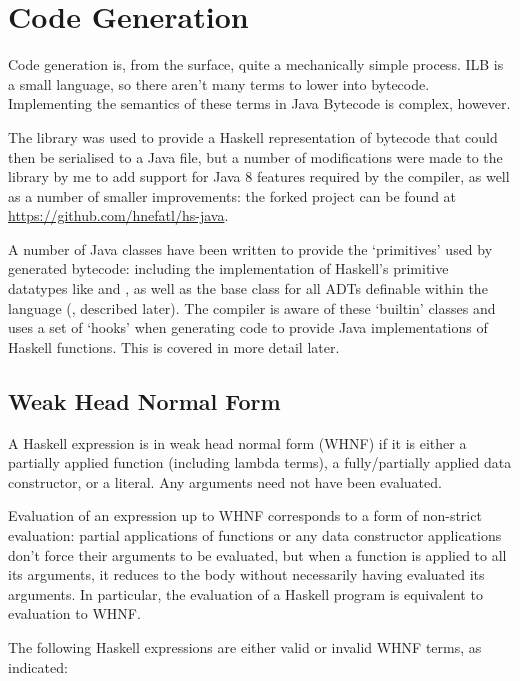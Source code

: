 \documentclass[dissertation.tex]{subfiles}
\begin{document}
\section{Code Generation}
{
    
    Code generation is, from the surface, quite a mechanically simple process. ILB is a small language, so there
    aren't many terms to lower into bytecode. Implementing the semantics of these terms in Java Bytecode is complex,
    however.

    The  library was used to provide a Haskell representation of bytecode that could then be
    serialised to a Java  file, but a number of modifications were made to the library by me to
    add support for Java 8 features required by the compiler, as well as a number of smaller improvements: the
    forked project can be found at \url{https://github.com/hnefatl/hs-java}.

    A number of Java classes have been written to provide the `primitives' used by generated bytecode: including the
    implementation of Haskell's primitive datatypes like  and , as well as the base class
    for all ADTs definable within the language (, described later). The compiler is aware of
    these `builtin' classes and uses a set of `hooks' when generating code to provide Java implementations of
    Haskell functions. This is covered in more detail later.

    \subsection{Weak Head Normal Form}
    {

        A Haskell expression is in weak head normal form (WHNF) if it is either a partially applied function
        (including lambda terms), a fully/partially applied data constructor, or a literal. Any arguments need not
        have been evaluated.
        
        Evaluation of an expression up to WHNF corresponds to a form of non-strict evaluation: partial applications
        of functions or any data constructor applications don't force their arguments to be evaluated, but when a
        function is applied to all its arguments, it reduces to the body without necessarily having evaluated its
        arguments. In particular, the evaluation of a Haskell program is equivalent to evaluation to WHNF.

        The following Haskell expressions are either valid or invalid WHNF terms, as indicated:

}}
\end{document}
